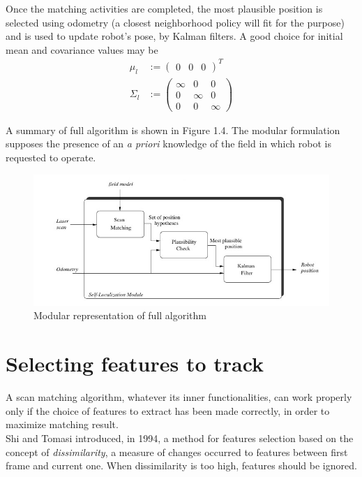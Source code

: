 \documentclass[a4paper, onecolumn]{report}
\begin{document}
Once the matching activities are completed, the most plausible position is selected using odometry (a closest neighborhood policy will fit for the purpose) and is used to update robot's pose, by Kalman filters. A good choice for initial mean and covariance values may be 
\begin{equation}
	\begin{aligned}
		\mu_l &:= \left(\begin{matrix}0 & 0 & 0\end{matrix}\right)^T \\
		\Sigma_l &:= \left(\begin{matrix} \infty & 0 & 0 \\ 0 & \infty & 0 \\ 0 & 0 & \infty\end{matrix}\right)
	\end{aligned}
\end{equation}

A summary of full algorithm is shown in Figure 1.4. The modular formulation supposes the presence of an \emph{a priori} knowledge of the field in which robot is requested to operate.
\begin{figure}[htbp]
\centering
\centering\setlength{\captionmargin}{0pt}%
\includegraphics[width=.90\textwidth]{images/robocup_alg_module.jpeg}
\caption{Modular representation of full algorithm}
\end{figure}

\section{Selecting features to track}
A scan matching algorithm, whatever its inner functionalities, can work properly only if the choice of features to extract has been made correctly, in order to maximize matching result. \\
Shi and Tomasi introduced, in 1994, a method for features selection based on the concept of \emph{dissimilarity}, a measure of changes occurred to features between first frame and current one. When dissimilarity is too high, features should be ignored. 
\end{document}
